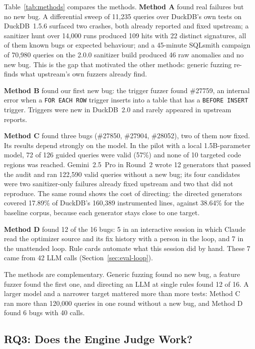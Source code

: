 Table~\ref{tab:methods} compares the methods. \textbf{Method A} found real failures but no new bug. A differential
sweep of 11{,}235 queries over DuckDB's own tests on DuckDB~1.5.6 surfaced two crashes, both already reported and fixed
upstream; a sanitizer hunt over 14{,}000 runs produced 109 hits with 22 distinct signatures, all of them known bugs or
expected behaviour; and a 45-minute SQLsmith campaign of 70{,}980 queries on the 2.0.0 sanitizer build produced 46 raw
anomalies and no new bug. This is the gap that motivated the other methods: generic fuzzing re-finds what upstream's
own fuzzers already find.

\textbf{Method B} found our first new bug: the trigger fuzzer found \#27759, an internal error when a
\texttt{FOR EACH ROW} trigger inserts into a table that has a \texttt{BEFORE INSERT} trigger. Triggers were new in
DuckDB~2.0 and rarely appeared in upstream reports.

\textbf{Method C} found three bugs (\#27850, \#27904, \#28052), two of them now fixed. Its results depend strongly on
the model. In the pilot with a local 1.5B-parameter model, 72 of 126 guided queries were valid (57\%) and none of 10
targeted code regions was reached. Gemini~2.5~Pro in Round~2 wrote 12 generators that passed the audit and ran
122{,}590 valid queries without a new bug; its four candidates were two sanitizer-only failures already fixed upstream
and two that did not reproduce. The same round shows the cost of directing: the directed generators covered 17.89\% of
DuckDB's 160{,}389 instrumented lines, against 38.64\% for the baseline corpus, because each generator stays close to
one target.

\textbf{Method D} found 12 of the 16 bugs: 5 in an interactive session in which Claude read the optimizer source and its fix history with a person in the loop, and 7 in the unattended loop. Rule cards automate what this session did by hand. These 7 came from 42 LLM calls (Section~\ref{sec:eval-loop}).

\begin{observation}
The methods are complementary. Generic fuzzing found no new bug, a feature fuzzer found the first one, and directing an
LLM at single rules found 12 of 16. A larger model and a narrower target mattered more than more tests: Method C ran
more than 120{,}000 queries in one round without a new bug, and Method D found 6 bugs with 40 calls.
\end{observation}

\subsection{RQ3: Does the Engine Judge Work?}
\label{sec:eval-judge}

